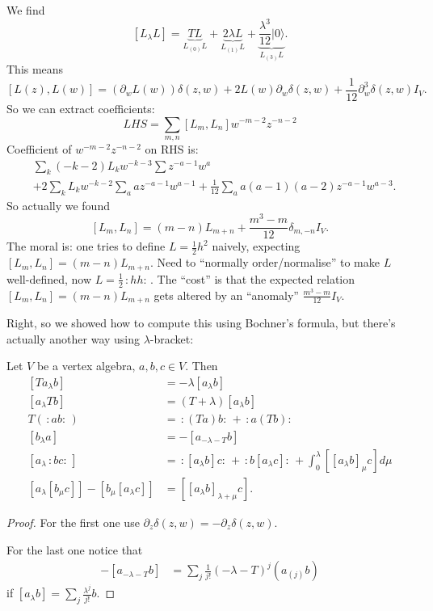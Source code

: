 \begin{example}
We find
$$
[L_\lambda L]=\underbrace{TL}_{L_{(0)}L}
+\underbrace{2\lambda L}_{L_{(1)}L}
+\underbrace{\frac{\lambda^3}{12}|0\rangle}
_{L_{(3)}L}.
$$
This means
\begin{equation}
\label{equation-looks-important}
[L(z),L(w)]=(\partial_wL(w))\delta(z,w)
+2L(w)\partial_w\delta(z,w)
+\frac{1}{12}\partial_w^3\delta(z,w)I_V.
\end{equation}
So we can extract coefficients:
$$
LHS=\sum_{m,n}[L_m,L_n]w^{-m-2}z^{-n-2}
$$
Coefficient of $w^{-m-2}z^{-n-2}$ on RHS is:
$$
\begin{aligned}
&\sum_{k}(-k-2)L_kw^{-k-3}\sum z^{-a-1}w^a\\
&+2\sum_{k}L_kw^{-k-2}\sum_{a}az^{-a-1}w^{a-
1}
+\frac{1}{12}\sum_{a}a(a-1)(a-2)z^{-a-1}w^{a-
3}.
\end{aligned}
$$
So actually we found
$$
[L_m,L_n]=(m-n)L_{m+n}+\frac{m^3-m}{12}
\delta_{m,-n}I_V.
$$
The moral is: one tries to define
$L=\frac{1}{2}h^2$ naively,
expecting $[L_m,L_n]=(m-n)L_{m+n}$.
Need to ``normally order/normalise'' to make
$L$
well-defined, now $L=\frac{1}{2}\,:\!h
h\!:\,$.
The ``cost'' is that the expected relation
$[L_m,L_n]=(m-n)L_{m+n}$ gets altered by an
``anomaly'' $\frac{m^3-m}{12}I_V$.
\end{example}

Right, so we showed how to compute this using
Bochner's
formula, but there's actually another way
using $\lambda$-bracket:

\begin{theorem}
\label{theorem-lambda-brackets}
Let $V$ be a vertex algebra, $a,b,c \in V$.
Then
\begin{align}
\label{equation-lambda-brackets}
[Ta_\lambda b]&=-\lambda[a_\lambda b]\\
[a_\lambda Tb]&=(T+\lambda)[a_\lambda b]\\
T(\,:\!ab\!:\,)&=\,:\!(Ta)b\!:\,+\,:\!a(Tb)
\!:\,\\
[b_\lambda a]&=-[a_{-\lambda -T}b]\\
[a_\lambda \,:\!bc\!:\,]&=\,:\![a_\lambda
b]c\!:\,+\,:\!b[a_\lambda c]\!:\,
+\int_0^\lambda [[a_\lambda b]_\mu c]d\mu\\
[a_\lambda[b_\mu c]]-[b_\mu [a_\lambda
c]]&=[[a_\lambda b]_{\lambda+\mu}c].
\end{align}
\end{theorem}

\begin{proof}
For the first one use $\partial_z
\delta(z,w)=-\partial_z \delta(z,w)$.

For the last one notice that
$$
\begin{aligned}
-[a_{-\lambda -
T}b]&=\sum_{j}\frac{1}{j!}(-\lambda-T)
^j(a_{(j)}b)
\end{aligned}
$$
if $[a_\lambda b]
=\sum_{j}\frac{\lambda^j}{j!}b$.
\end{proof}

